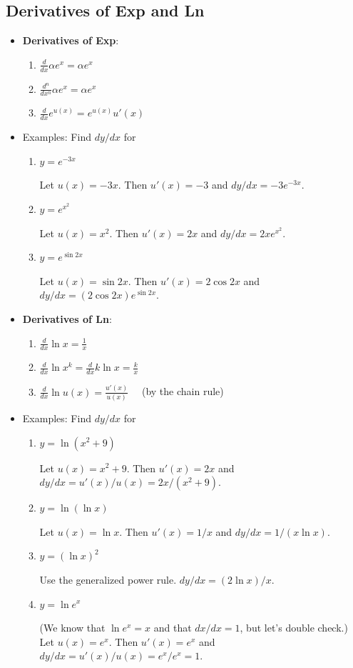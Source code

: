 \documentclass[11pt]{article}
\newcommand{\bi}{\begin{itemize}}
\newcommand{\ei}{\end{itemize}}
\newcommand{\be}{\begin{enumerate}}
\newcommand{\ee}{\end{enumerate}}
\newcommand{\pbof}{\parbox[t]{1.5in}}
\newcommand{\pbff}{\parbox[t]{4in}}
\begin{document}
\subsection{Derivatives of Exp and Ln}
\bi
\item {\bf Derivatives of Exp}:
  \be
  \item $\frac{d}{dx}\alpha e^x = \alpha e^x$
  \item $\frac{d^n}{dx^n} \alpha e^x = \alpha e^x$
  \item $\frac{d}{dx}e^{u(x)}= e^{u(x)} u'(x)$
  \ee

\item Examples:  Find $dy/dx$ for
  \be
  \item \pbof{$y=e^{-3x}$}\pbff{Let $u(x)=-3x$.  Then $u'(x)=-3$
and $dy/dx=-3e^{-3x}$.}
  \item \pbof{$y=e^{x^2}$}\pbff{Let $u(x)=x^2$.  Then $u'(x)=2x$
and $dy/dx=2xe^{x^2}$.}
  \item \pbof{$y=e^{\sin 2x}$}\pbff{Let $u(x)=\sin 2x$.  Then
$u'(x)=2\cos 2x$ and $dy/dx=(2\cos 2x) e^{\sin 2x}$.}
  \ee

\item {\bf Derivatives of Ln}:
  \be
  \item $\frac{d}{dx} \ln x = \frac{1}{x}$
  \item $\frac{d}{dx} \ln x^k = \frac{d}{dx} k \ln x = \frac{k}{x}$
  \item $\frac{d}{dx} \ln u(x) = \frac{u'(x)}{u(x)}\quad$  (by the chain rule)
  \ee

\item Examples:  Find $dy/dx$ for
  \be
  \item \pbof{$y=\ln(x^2+9)$}\pbff{Let $u(x)=x^2+9$.  Then
$u'(x)=2x$ and $dy/dx=u'(x)/u(x)=2x/(x^2+9)$.}
  \item \pbof{$y=\ln(\ln x)$}\pbff{Let $u(x)=\ln x$.  Then
$u'(x)=1/x$ and $dy/dx=1/(x\ln x)$.}
  \item \pbof{$y=(\ln x)^2$}\pbff{Use the generalized power rule.
 $dy/dx=(2\ln x)/x$.}
  \item \pbof{$y=\ln e^x$}\pbff{(We know that $\ln e^x=x$ and
that $dx/dx=1$, but let's double check.)  Let $u(x)=e^x$.  Then
$u'(x)=e^x$ and $dy/dx=u'(x)/u(x)=e^x/e^x=1$.}
  \ee


\ei
\end{document}

